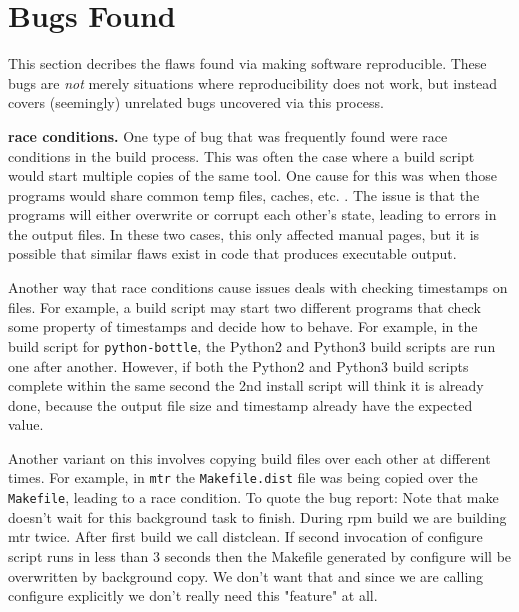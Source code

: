 \section{Bugs Found}
\label{SEC:bugs}

This section decribes the flaws found via making software reproducible.  These
bugs are \emph{not} merely situations where reproducibility does not work, but
instead covers (seemingly) unrelated bugs uncovered via this process.



{\bf race conditions.}
One type of bug that was frequently found were race conditions in the build
process.  This was often the case where a build script would start multiple
copies of the same tool.  One cause for this was when those programs would 
share common temp files, caches, etc. .  The issue is that the
programs will either overwrite or corrupt each other's state, leading to
errors in the output files.  
In these two cases, this only affected manual pages, but it is possible that 
similar flaws exist in code that produces executable output.

Another way that race conditions cause issues deals with checking
timestamps on files.  For example, a build script may start two different
programs that check some property of timestamps and decide how to behave.
For example, in the build script for {\tt python-bottle}, the Python2 and 
Python3 build scripts are run one after another.  However, if both the
Python2 and Python3 build scripts complete within the same second the
2nd install script will think it is already done, because the output file
size and timestamp already have the expected value.


Another variant on this involves copying build files over each other at
different times.  For example, in {\tt mtr} the {\tt Makefile.dist} file 
was being copied over the {\tt Makefile}, leading to a race condition.
To quote the bug report:
Note that make doesn't wait for this background task to finish. During
rpm build we are building mtr twice. After first build we call
distclean. If second invocation of configure script runs in less than 3
seconds then the Makefile generated by configure will be overwritten by
background copy. We don't want that and since we are calling configure
explicitly we don't really need this "feature" at all.
